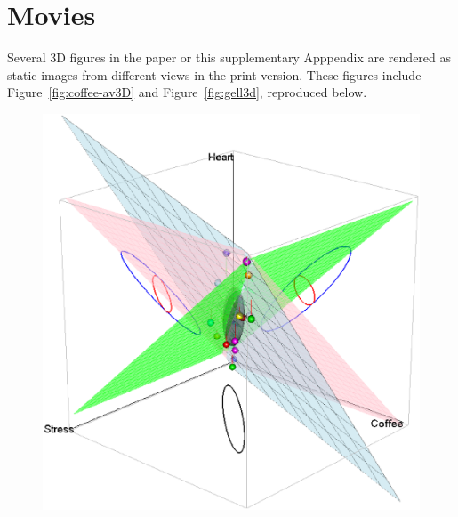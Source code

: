 \documentclass[11pt]{article}%
\newcommand*{\figref}[1]{Figure~\ref{#1}}
\begin{document}
\section{Movies}\label{sec:movies}
Several 3D figures in the paper or this supplementary Apppendix are rendered as static images from different views
in the print version.  These figures include \figref{fig:coffee-av3D} and \figref{fig:gell3d}, reproduced below.

\begin{figure}[htb]
 \begin{minipage}[b]{.49\linewidth}
  \centering
  \includegraphics[width=1\linewidth]{fig/coffee-av3D-1}
 \end{minipage}%
 \hfill
 \begin{minipage}[b]{.49\linewidth}
  \centering

\end{minipage}
\end{figure}
\end{document}
